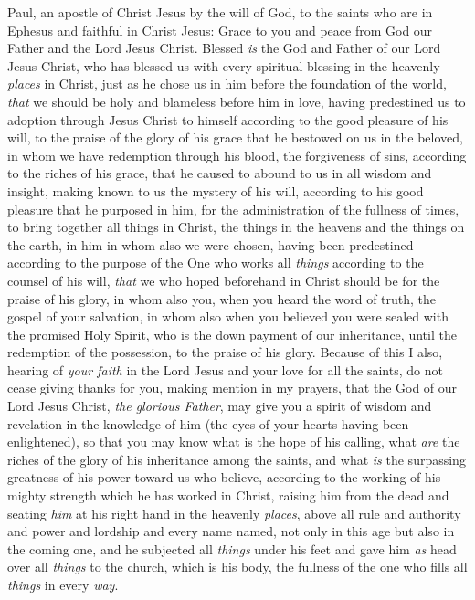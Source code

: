 
\begin{biblechapter} %
 Paul, an apostle of Christ Jesus by the will of God, to the saints who are in Ephesus and faithful in Christ Jesus:
\verse Grace to you and peace from God our Father and the Lord Jesus Christ.
 Blessed \textit{is} the God and Father of our Lord Jesus Christ, who has blessed us with every spiritual blessing in the heavenly \textit{places} in Christ,
\verse just as he chose us in him before the foundation of the world, \textit{that} we should be holy and blameless before him in love,
\verse having predestined us to adoption through Jesus Christ to himself according to the good pleasure of his will,
\verse to the praise of the glory of his grace that he bestowed on us in the beloved,
\verse in whom we have redemption through his blood, the forgiveness of sins, according to the riches of his grace,
\verse that he caused to abound to us in all wisdom and insight,
\verse making known to us the mystery of his will, according to his good pleasure that he purposed in him,
\verse for the administration of the fullness of times, to bring together all things in Christ, the things in the heavens and the things on the earth, in him
\verse in whom also we were chosen, having been predestined according to the purpose of the One who works all \textit{things} according to the counsel of his will,
\verse \textit{that} we who hoped beforehand in Christ should be for the praise of his glory,
\verse in whom also you, when you heard the word of truth, the gospel of your salvation, in whom also when you believed you were sealed with the promised Holy Spirit,
\verse who is the down payment of our inheritance, until the redemption of the possession, to the praise of his glory.
 Because of this I also, hearing of \textit{your faith} in the Lord Jesus and your love for all the saints,
\verse do not cease giving thanks for you, making mention in my prayers,
\verse that the God of our Lord Jesus Christ, \textit{the glorious Father}, may give you a spirit of wisdom and revelation in the knowledge of him
\verse (the eyes of your hearts having been enlightened), so that you may know what is the hope of his calling, what \textit{are} the riches of the glory of his inheritance among the saints,
\verse and what \textit{is} the surpassing greatness of his power toward us who believe, according to the working of his mighty strength
\verse which he has worked in Christ, raising him from the dead and seating \textit{him} at his right hand in the heavenly \textit{places},
\verse above all rule and authority and power and lordship and every name named, not only in this age but also in the coming one,
\verse and he subjected all \textit{things} under his feet and gave him \textit{as} head over all \textit{things} to the church,
\verse which is his body, the fullness of the one who fills all \textit{things} in every \textit{way}.
\end{biblechapter}


